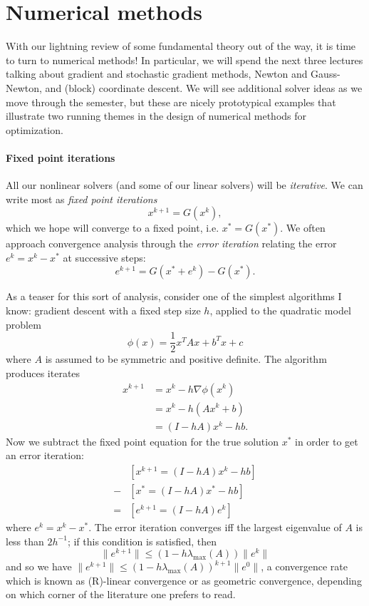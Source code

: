 \documentclass[12pt, leqno]{article} %
\begin{document}
\section{Numerical methods}

With our lightning review of some fundamental theory out of the way,
it is time to turn to numerical methods!  In particular, we will spend
the next three lectures talking about gradient and stochastic gradient
methods, Newton and Gauss-Newton, and (block) coordinate descent.
We will see additional solver ideas as we move through the semester,
but these are nicely prototypical examples that illustrate two running
themes in the design of numerical methods for optimization.

\paragraph{Fixed point iterations}
All our nonlinear solvers (and some of our linear solvers) will be
{\em iterative}.  We can write most as {\em fixed point iterations}
\begin{equation}
  x^{k+1} = G(x^k), \label{eq:fixed-point}
\end{equation}
which we hope will converge to a fixed point, i.e. $x^* = G(x^*)$.
We often approach convergence analysis through the
{\em error iteration} relating the error $e^k = x^k-x^*$ at
successive steps:
\begin{equation}
  e^{k+1} = G(x^* + e^k)-G(x^*).
\end{equation}

As a teaser for this sort of analysis, consider one of the simplest
algorithms I know: gradient descent with a fixed step size $h$, applied
to the quadratic model problem
\[
  \phi(x) = \frac{1}{2} x^T A x + b^T x + c
\]
where $A$ is assumed to be symmetric and positive definite.  The
algorithm produces iterates
\begin{align*}
  x^{k+1}
  &= x^k - h \nabla \phi(x^k) \\
  &= x^k - h (Ax^k + b) \\
  &= (I-hA) x^k - h b.
\end{align*}
Now we subtract the fixed point equation for the true solution $x^*$
in order to get an error iteration:
\begin{align*}
    & [x^{k+1} = (I-hA) x^k - hb] \\
  - & [x^*     = (I-hA) x^* - hb] \\ \hline
  = & [e^{k+1} = (I-hA) e^k ]
\end{align*}
where $e^k = x^k-x^*$.  The error iteration converges iff the largest
eigenvalue of $A$ is less than $2 h^{-1}$; if this condition is
satisfied, then
\[
  \|e^{k+1}\| \leq (1-h\lambda_{\max}(A)) \|e^k\|
\]
and so we have $\|e^{k+1}\| \leq (1-h\lambda_{\max}(A))^{k+1} \|e^0\|$,
a convergence rate which is known as (R)-linear convergence or
as geometric convergence, depending on which corner of the literature
one prefers to read.
\end{document}
